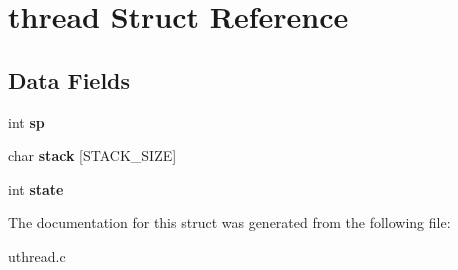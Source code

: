\hypertarget{structthread}{}\section{thread Struct Reference}
\label{structthread}
\subsection*{Data Fields}
\begin{DoxyCompactItemize}
\item 
int {\bfseries sp}\hypertarget{structthread_a35fe6e040ea7b812a63f74c885a598d6}{}\label{structthread_a35fe6e040ea7b812a63f74c885a598d6}

\item 
char {\bfseries stack} \mbox{[}S\+T\+A\+C\+K\+\_\+\+S\+I\+ZE\mbox{]}\hypertarget{structthread_a10fde37c8131d5d912d9e2030e2d9ba5}{}\label{structthread_a10fde37c8131d5d912d9e2030e2d9ba5}

\item 
int {\bfseries state}\hypertarget{structthread_af4eb2d11f62e4bb8b997e60a82a68258}{}\label{structthread_af4eb2d11f62e4bb8b997e60a82a68258}

\end{DoxyCompactItemize}


The documentation for this struct was generated from the following file\+:\begin{DoxyCompactItemize}
\item 
uthread.\+c\end{DoxyCompactItemize}
